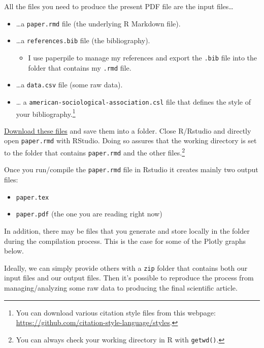 \documentclass[
  12pt,
]{article}
\providecommand{\tightlist}{%
  \setlength{\itemsep}{0pt}\setlength{\parskip}{0pt}}
\begin{document}
All the files you need to produce the present PDF file are the input files\ldots{}

\begin{itemize}
\tightlist
\item
  \ldots a \texttt{paper.rmd} file (the underlying R Markdown file).
\item
  \ldots a \texttt{references.bib} file (the bibliography).

  \begin{itemize}
  \tightlist
  \item
    I use paperpile to manage my references and export the \texttt{.bib} file into the folder that contains my \texttt{.rmd} file.
  \end{itemize}
\item
  \ldots a \texttt{data.csv} file (some raw data).
\item
  \ldots{} a \texttt{american-sociological-association.csl} file that defines the style of your bibliography.\footnote{You can download various citation style files from this webpage: \url{https://github.com/citation-style-language/styles}.}
\end{itemize}

\href{https://drive.google.com/drive/folders/1zJP3cNPrHN-gj0rcmbHQgg-XA0hqDXdd?usp=sharing}{Download these files} and save them into a folder. Close R/Rstudio and directly open \texttt{paper.rmd} with RStudio. Doing so assures that the working directory is set to the folder that contains \texttt{paper.rmd} and the other files.\footnote{You can always check your working directory in R with \texttt{getwd()}.}

Once you run/compile the \texttt{paper.rmd} file in Rstudio it creates mainly two output files:

\begin{itemize}
\tightlist
\item
  \texttt{paper.tex}
\item
  \texttt{paper.pdf} (the one you are reading right now)
\end{itemize}

In addition, there may be files that you generate and store locally in the folder during the compilation process. This is the case for some of the Plotly graphs below.

Ideally, we can simply provide others with a \texttt{zip} folder that contains both our input files and our output files. Then it's possible to reproduce the process from managing/analyzing some raw data to producing the final scientific article.
\end{document}
